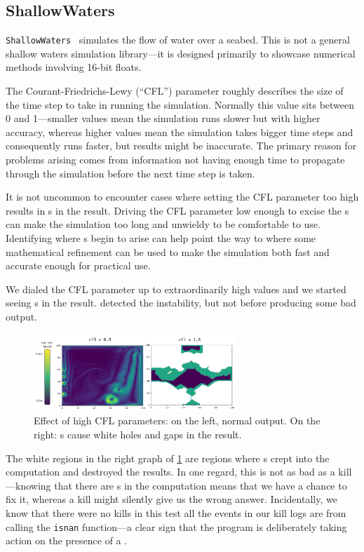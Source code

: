 \documentclass{juliacon}
\begin{document}
\subsection{ShallowWaters}
\label{s:sw}

\texttt{ShallowWaters}~\cite{klowerNumberFormatsError2020,klowerPositsAlternativeFloats2019,klowerLowprecisionClimateComputing2021} simulates the flow of water over a seabed.
This is not a general shallow waters simulation library---it is designed primarily to showcase numerical methods involving 16-bit floats.

The Courant-Friedrichs-Lewy (``CFL'') parameter roughly describes the size of the time step to take in running the simulation.
Normally this value sits between 0 and 1---smaller values mean the simulation runs slower but with higher accuracy, whereas higher values mean the simulation takes bigger time steps and consequently runs faster, but results might be inaccurate.
The primary reason for problems arising comes from information not having enough time to propagate through the simulation before the next time step is taken.

It is not uncommon to encounter cases where setting the CFL parameter too high results in \NaN{}s in the result.
Driving the CFL parameter low enough to excise the \NaN{}s can make the simulation too long and unwieldy to be comfortable to use.
Identifying where \NaN{}s begin to arise can help point the way to where some mathematical refinement can be used to make the simulation both fast and accurate enough for practical use.

We dialed the CFL parameter up to extraordinarily high values and we started seeing \NaN{}s in the result.
 detected the instability, but not before producing some bad output.

\begin{figure}[t]
  \centering
  \includegraphics[width=3in]{./fig/shallow_waters_cfl_diff.png}
  \caption{Effect of high CFL parameters: on the left, normal output. On the right: \NaN{}s cause white holes and gaps in the result.}
  \label{fig:sw_nans}
\end{figure}

The white regions in the right graph of \cref{fig:sw_nans} are regions where \NaN{}s crept into the computation and destroyed the results.
In one regard, this is not as bad as a \NaN{} kill---knowing that there are \NaN{}s in the computation means that we have a chance to fix it, whereas a \NaN{} kill might silently give us the wrong answer.
Incidentally, we know that there were no \NaN{} kills in this test all the events in our kill logs are from calling the \texttt{isnan} function---a clear sign that the program is deliberately taking action on the presence of a \NaN{}.
\end{document}
